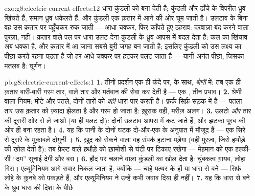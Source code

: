 \begin{solution}{exo:g8:electric-current-effects:12}
धारा कुंडली को  बना देती है; कुंडली और ढाँचे के विपरीत ध्रुव
खिंचते हैं, समान ध्रुव धकेलते हैं, और कुंडली एक क़तार में आने की ओर
घूम जाती है। उलटाव के बिना वह उस क़तार पर पहुँचकर रुक जाती ---
आधा चक्कर, फिर काँपते हुए ठहराव: दरवाज़ा बंद करने वाला पुरज़ा, 
नहीं। क़तार वाले पल पर धारा उलट देना कुंडली के ध्रुव आपस में बदल देता
है: कल का खिंचाव अब धक्का है, और क़तार में आ जाना सबसे बुरी जगह बन
जाती है; इसलिए कुंडली को उस लक्ष्य का पीछा करते रहना पड़ता है जो हर
आधे चक्कर पर हटकर पलट जाता है --- यानी अनंत पीछा, जिसका मतलब है:
घूर्णन।
\end{solution}

\begin{solution}{pb:g8:electric-current-effects:1}
\textbf{1.} तीनों प्रदर्शन एक ही फंदे पर,  के साथ,
\emph{श्रेणी} में: तब एक ही क़तार बारी-बारी गरम तार,  वाले
तार और मर्तबान की सेवा कर देती है --- एक , तीन प्रभाव।
\textbf{2.} श्रेणी वाला नियम: मोटे और पतले, दोनों तारों को \emph{वही}
धारा पार करती है। फ़र्क़ सिर्फ़ सड़क में है --- पतला तार उस क़तार को
ज़्यादा झेलता है और गरम हो जाता है: ख़ुराक वही, मरीज़ अलग।
\textbf{3.}  उलटो \emph{और} तार  की दूसरी ओर से ले जाओ
(या  ही पलट दो): दोनों उलटाव आपस में कट जाते हैं, और झटका
पूरब की ओर ही बना रहता है।
\textbf{4.} यह कि पानी के दोनों घटक दो-और-एक के अनुपात में मौजूद हैं
--- एक सिरे से दूसरे के मुक़ाबले दोगुनी ।
\textbf{5.} ख़ुद को रोकने वाला वह संपर्क हटाना पड़ेगा (वही पुरज़ा,
जिसे हथौड़े की  खोल देती है): तब  फ़ेल्ट वाले हथौड़े
को ख़ामोशी से घंटी पर टिकाए रखेगा --- मेहमान को एक हल्की-सी ``दम''
सुनाई देगी और बस।
\textbf{6.} हौद पर चलाने वाला कुंडली का  खोल देता है: चुंबकत्व
ग़ायब, लोहा गिरा। एल्यूमिनियम आगे सवार निकल जाता है, क्योंकि  ---
चाहे पत्थर के हों या धारा से बने --- सिर्फ़ लोहे के कुनबे को पकड़ते
हैं, और एल्यूमिनियम ने उन्हें कभी जवाब दिया ही नहीं।
\textbf{7.} यह कि धारा से बने  के ध्रुव धारा की दिशा के पीछे

\end{solution}
